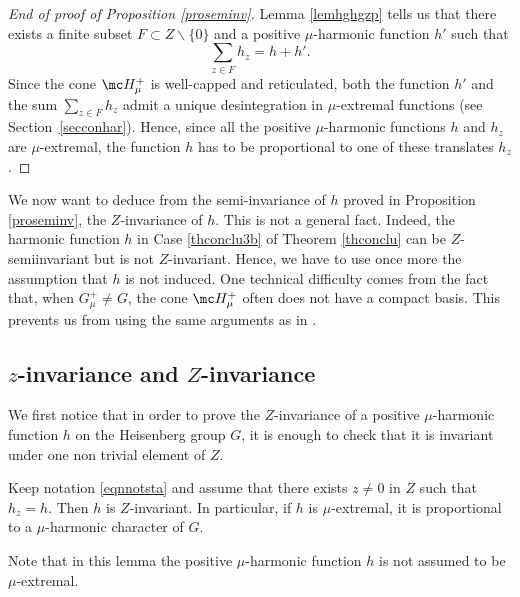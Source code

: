 \begin{proof}[End of proof of Proposition \ref{proseminv}]
Lemma \ref{lemhghgzp} tells us that there exists a finite subset $F\subset Z\smallsetminus\{0\}$ and a positive $\mu$-harmonic function $h'$ such that
\[
\sum_{z\in F} h_z=h+h'.
\]
Since the cone $\mc H_\mu^+$ is well-capped and reticulated,
both the function $h'$ and the sum $\sum_{z\in F}h_z$ admit a unique desintegration in $\mu$-extremal functions
(see Section~\ref{secconhar}).
Hence, since all the positive $\mu$-harmonic functions $h$ and $h_z$ are $\mu$-extremal,
the function $h$ has to be proportional to one of these translates $h_z$.
\end{proof}

\begin{Rem}
We now want to deduce from the semi-invariance of $h$
proved in Proposition \ref{proseminv}, the $Z$-invariance of $h$.
This is not a general fact.
Indeed, the harmonic function $h$ in Case \eqref{thconclu3b} of Theorem \ref{thconclu}
can be $Z$-semiinvariant but is not $Z$-invariant.
Hence, we have to use once more the assumption that $h$ is not induced.
One technical difficulty comes from the fact that, when
$G^+_\mu\neq G$, the cone $\mc H_\mu^+$
often does not have a compact basis. This prevents us from using
the same arguments as in \cite{Margulis66}.
\end{Rem}

\subsection{$z$-invariance and $Z$-invariance}
\label{seczinzin}

\bq
We first notice that in order to prove the $Z$-invariance
of a positive $\mu$-harmonic function $h$ on the Heisenberg group $G$, it is enough
to check that it is invariant under one non trivial element of $Z$.
\eq

\begin{Lem}
\label{lemzinzin}
Keep notation \eqref{eqnnotsta} and
assume that there exists $z\neq 0$ in $Z$ such that
$h_z=h$. Then $h$ is $Z$-invariant.
In particular, if $h$ is $\mu$-extremal, it is proportional to a $\mu$-harmonic character of $G$.
\end{Lem}

Note that in this lemma the positive $\mu$-harmonic function $h$
is not assumed to be $\mu$-extremal.

